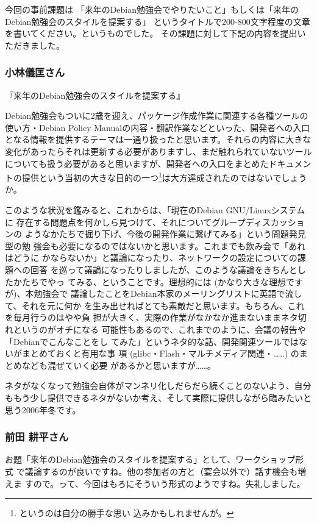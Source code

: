 \documentclass[mingoth,a4paper]{jsarticle}
\begin{document}
今回の事前課題は
「来年のDebian勉強会でやりたいこと」もしくは「来年の
Debian勉強会のスタイルを提案する」
というタイトルで200-800文字程度の文章を書いてください。というものでした。
その課題に対して下記の内容を提出いただきました。

\subsubsection{小林儀匡さん}

『来年のDebian勉強会のスタイルを提案する』

Debian勉強会もついに2歳を迎え、パッケージ作成作業に関連する各種ツールの
使い方・Debian Policy Manualの内容・翻訳作業などといった、開発者への入口
となる情報を提供するテーマは一通り扱ったと思います。それらの内容に大きな
変化があったらそれは更新する必要がありますし、まだ触れられていないツール
についても扱う必要があると思いますが、開発者への入口をまとめたドキュメン
トの提供という当初の大きな目的の一つ\footnote{というのは自分の勝手な思い
込みかもしれませんが。}は大方達成されたのではないでしょうか。

このような状況を鑑みると、これからは、「現在のDebian GNU/Linuxシステムに
存在する問題点を何かしら見つけて、それについてグループディスカッションの
ようなかたちで掘り下げ、今後の開発作業に繋げてみる」という問題発見型の勉
強会も必要になるのではないかと思います。これまでも飲み会で「あれはどうに
かならないか」と議論になったり、ネットワークの設定についての課題への回答
を巡って議論になったりしましたが、このような議論をきちんとしたかたちでやっ
てみる、ということです。理想的には (かなり大きな理想ですが)、本勉強会で
議論したことをDebian本家のメーリングリストに英語で流して、それを元に何か
を生み出せればとても素敵だと思います。もちろん、これを毎月行うのはやや負
担が大きく、実際の作業がなかなか進まないままネタ切れというのがオチになる
可能性もあるので、これまでのように、会議の報告や「Debianでこんなことをし
てみた」というネタ的な話、開発関連ツールではないがまとめておくと有用な事
項 (glibc・Flash・マルチメディア関連・……) のまとめなども混ぜていく必要
があるかと思いますが……。

ネタがなくなって勉強会自体がマンネリ化しだらだら続くことのないよう、自分
ももう少し提供できるネタがないか考え、そして実際に提供しながら臨みたいと
思う2006年冬です。

\subsubsection{前田 耕平さん}


お題「来年のDebian勉強会のスタイルを提案する」として、ワークショップ形式
で議論するのが良いですね。他の参加者の方と（宴会以外で）話す機会も増えま
すので。って、今回はもろにそういう形式のようですね。失礼しました。
\end{document}
